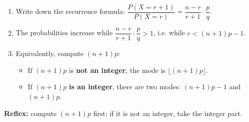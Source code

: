 \documentclass[11pt]{article}
\begin{document}
\begin{methode}
\begin{enumerate}
\item Write down the recurrence formula: $\dfrac{P(X = r+1)}{P(X = r)} = \dfrac{n - r}{r + 1}\cdot\dfrac{p}{q}$.
\item The probabilities increase while $\dfrac{n-r}{r+1}\cdot\dfrac{p}{q} > 1$, i.e. while $r < (n+1)p - 1$.
\item Equivalently, compute $(n+1)p$:
\begin{itemize}
\item If $(n+1)p$ is \textbf{not an integer}, the mode is $\lfloor (n+1)p \rfloor$.
\item If $(n+1)p$ \textbf{is an integer}, there are two modes: $(n+1)p - 1$ and $(n+1)p$.
\end{itemize}
\end{enumerate}
\textbf{Reflex:} compute $(n+1)p$ first; if it is not an integer, take the integer part.
\end{methode}
\end{document}
